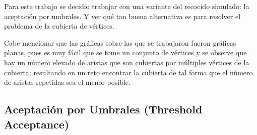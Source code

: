 \documentclass{article}
\begin{document}
  Para este trabajo se decidio trabajar con una variante del 
  recocido simulado: la aceptación por umbrales. Y ver qué tan
  buena alternativa es para resolver el problema de la cubierta
  de vértices. 

  Cabe mencionar que las gráficas sobre las que se trabajaron fueron 
  gráficas planas, pues es muy fácil que se tome un conjunto de vértices
  y se observe que hay un número elevado de aristas que son cubiertas por 
  múltiples vértices de la cubierta; resultando en un reto encontrar 
  la cubierta de tal forma que el número de aristas repetidas sea el 
  menor posible.

  \subsection{Aceptación por Umbrales (Threshold Acceptance)}
  
  
\end{document}
